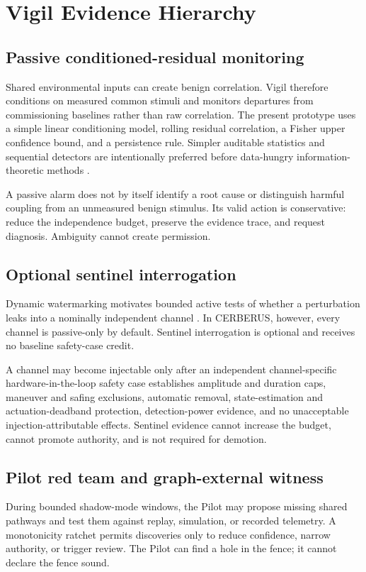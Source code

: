 \section{Vigil Evidence Hierarchy}
\subsection{Passive conditioned-residual monitoring}
Shared environmental inputs can create benign correlation. Vigil therefore conditions on measured common stimuli and monitors departures from commissioning baselines rather than raw correlation. The present prototype uses a simple linear conditioning model, rolling residual correlation, a Fisher upper confidence bound, and a persistence rule. Simpler auditable statistics and sequential detectors are intentionally preferred before data-hungry information-theoretic methods \cite{Page1954,BassevilleNikiforov1993,Schreiber2000}.

A passive alarm does not by itself identify a root cause or distinguish harmful coupling from an unmeasured benign stimulus. Its valid action is conservative: reduce the independence budget, preserve the evidence trace, and request diagnosis. Ambiguity cannot create permission.

\subsection{Optional sentinel interrogation}
Dynamic watermarking motivates bounded active tests of whether a perturbation leaks into a nominally independent channel \cite{MoSinopoli2009,MoWeerakkodySinopoli2015,SatchidanandanKumar2017}. In CERBERUS, however, every channel is passive-only by default. Sentinel interrogation is optional and receives no baseline safety-case credit.

A channel may become injectable only after an independent channel-specific hardware-in-the-loop safety case establishes amplitude and duration caps, maneuver and safing exclusions, automatic removal, state-estimation and actuation-deadband protection, detection-power evidence, and no unacceptable injection-attributable effects. Sentinel evidence cannot increase the budget, cannot promote authority, and is not required for demotion.

\subsection{Pilot red team and graph-external witness}
During bounded shadow-mode windows, the Pilot may propose missing shared pathways and test them against replay, simulation, or recorded telemetry. A monotonicity ratchet permits discoveries only to reduce confidence, narrow authority, or trigger review. The Pilot can find a hole in the fence; it cannot declare the fence sound.

